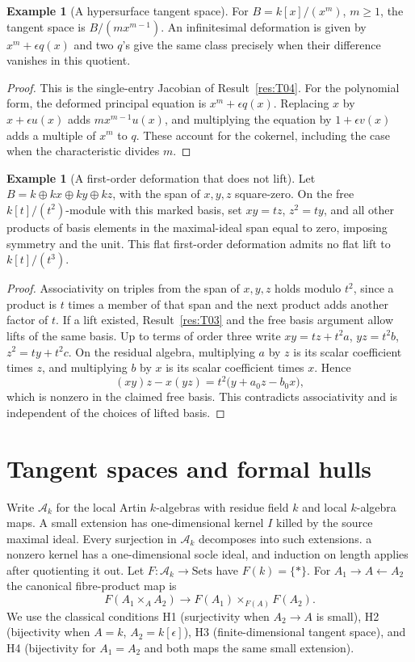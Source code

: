 \documentclass[11pt,oneside,openany]{book}
\theoremstyle{definition}
\newtheorem{example}[theorem]{Example}
\theoremstyle{remark}
\begin{document}
\begin{example}[A hypersurface tangent space]\label{res:T05}
For \(B=k[x]/(x^m)\), \(m\geq1\), the tangent space is
\(B/(m x^{m-1})\). An infinitesimal deformation is given by
\(x^m+\epsilon q(x)\) and two \(q\)'s give the same class precisely
when their difference vanishes in this quotient.
\end{example}
\begin{proof}
This is the single-entry Jacobian of Result~\ref{res:T04}.
For the polynomial form, the deformed principal equation is
\(x^m+\epsilon q(x)\). Replacing \(x\) by \(x+\epsilon u(x)\)
adds \(m x^{m-1}u(x)\), and multiplying the equation by
\(1+\epsilon v(x)\) adds a multiple of \(x^m\) to \(q\).
These account for the cokernel, including the case when the
characteristic divides \(m\).
\end{proof}

\begin{example}[A first-order deformation that does not lift]\label{res:T06}
Let \(B=k\oplus kx\oplus ky\oplus kz\), with the span of \(x,y,z\)
square-zero. On the free \(k[t]/(t^2)\)-module with this marked basis,
set \(xy=tz\), \(z^2=ty\), and all other products of basis elements
in the maximal-ideal span equal to zero, imposing symmetry and the unit.
This flat first-order deformation admits no flat lift to \(k[t]/(t^3)\).
\end{example}
\begin{proof}
Associativity on triples from the span of \(x,y,z\) holds modulo
\(t^2\), since a product is \(t\) times a member of that span
and the next product adds another factor of \(t\).
If a lift existed, Result~\ref{res:T03} and the free basis argument
allow lifts of the same basis. Up to terms of order three write
\(xy=tz+t^2a\), \(yz=t^2b\), \(z^2=ty+t^2c\).
On the residual algebra, multiplying \(a\) by \(z\) is its
scalar coefficient times \(z\), and multiplying \(b\) by \(x\)
is its scalar coefficient times \(x\). Hence
\[
 (xy)z-x(yz)=t^2\bigl(y+a_0z-b_0x\bigr),
\]
which is nonzero in the claimed free basis. This contradicts
associativity and is independent of the choices of lifted basis.
\end{proof}

\section{Tangent spaces and formal hulls}

Write \(\mathcal A_k\) for the local Artin \(k\)-algebras with residue
field \(k\) and local \(k\)-algebra maps. A small extension has
one-dimensional kernel \(I\) killed by the source maximal ideal.
Every surjection in \(\mathcal A_k\) decomposes into such extensions.
a nonzero kernel has a one-dimensional socle ideal, and induction on
length applies after quotienting it out. Let \(F:\mathcal A_k\to
\mathrm{Sets}\) have \(F(k)=\{*\}\). For \(A_1\to A\leftarrow A_2\)
the canonical fibre-product map is
\[
 F(A_1\times_A A_2)\longrightarrow F(A_1)\times_{F(A)}F(A_2).
\]
We use the classical conditions H1 (surjectivity when \(A_2\to A\)
is small), H2 (bijectivity when \(A=k\), \(A_2=k[\epsilon]\)),
H3 (finite-dimensional tangent space), and H4 (bijectivity for
\(A_1=A_2\) and both maps the same small extension).
\end{document}
